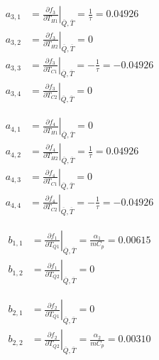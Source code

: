 \begin{equation*}
	\begin{aligned}
		a_{3,1} &= \left. \frac{\partial f_3}{\partial T_{H1}} \right|_{\overline{Q},\overline{T}} = 
				  \frac{1}{\tau} =
				  0.04926
				  \\
		a_{3,2} &= \left. \frac{\partial f_3}{\partial T_{H2}} \right|_{\overline{Q},\overline{T}} = 
				  0
				  \\
		a_{3,3} &= \left. \frac{\partial f_3}{\partial T_{C1}} \right|_{\overline{Q},\overline{T}} = 
				  - \frac{1}{\tau} =
				  - 0.04926
				  \\
		a_{3,4} &= \left. \frac{\partial f_3}{\partial T_{C2}} \right|_{\overline{Q},\overline{T}} = 
				  0
	\end{aligned}
\end{equation*}

\begin{equation*}
	\begin{aligned}
		a_{4,1} &= \left. \frac{\partial f_4}{\partial T_{H1}} \right|_{\overline{Q},\overline{T}} = 
				  0
				  \\
		a_{4,2} &= \left. \frac{\partial f_4}{\partial T_{H2}} \right|_{\overline{Q},\overline{T}} = 
				  \frac{1}{\tau} =
				  0.04926
				  \\	
		a_{4,3} &= \left. \frac{\partial f_4}{\partial T_{C1}} \right|_{\overline{Q},\overline{T}} = 
				  0
				  \\
		a_{4,4} &= \left. \frac{\partial f_4}{\partial T_{C2}} \right|_{\overline{Q},\overline{T}} = 
				  - \frac{1}{\tau} =
				  - 0.04926
	\end{aligned}
\end{equation*}

\begin{equation*}
	\begin{aligned}
		b_{1,1} &= \left. \frac{\partial f_1}{\partial T_{Q1}} \right|_{\overline{Q},\overline{T}} = 
				  \frac{\alpha_1}{m C_p} =
				  0.00615
				  \\
		b_{1,2} &= \left. \frac{\partial f_1}{\partial T_{Q2}} \right|_{\overline{Q},\overline{T}} = 
				  0
	\end{aligned}
\end{equation*}

\begin{equation*}
	\begin{aligned}
		b_{2,1} &= \left. \frac{\partial f_2}{\partial T_{Q1}} \right|_{\overline{Q},\overline{T}} = 
				  0
				  \\
		b_{2,2} &= \left. \frac{\partial f_2}{\partial T_{Q2}} \right|_{\overline{Q},\overline{T}} = 
				  \frac{\alpha_2}{m C_p} =
				  0.00310
	\end{aligned}
\end{equation*}

